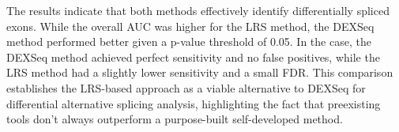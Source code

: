 \documentclass{article}
\begin{document}
    The results indicate that both methods effectively identify differentially spliced exons. While the overall AUC was higher for the LRS method, the DEXSeq method performed better given a p-value threshold of 0.05. In the case, the DEXSeq method achieved perfect sensitivity and no false positives, while the LRS method had a slightly lower sensitivity and a small FDR. This comparison establishes the LRS-based approach as a viable alternative to DEXSeq for differential alternative splicing analysis, highlighting the fact that preexisting tools don't always outperform a purpose-built self-developed method.

    \AtNextBibliography{\small}
    \printbibliography
\end{document}
